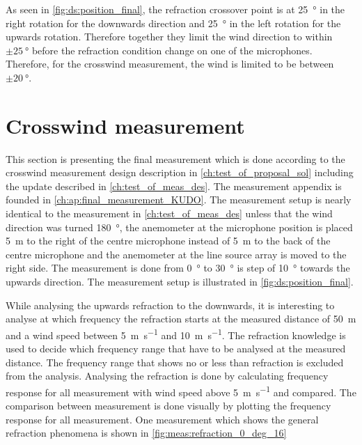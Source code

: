 As seen in \autoref{fig:ds:position_final}, the refraction crossover point is at \SI{25}{\degree} in the right rotation for the downwards direction and \SI{25}{\degree} in the left rotation for the upwards rotation. Therefore together they limit the wind direction to within $\pm\SI{25}{\degree}$ before the refraction condition change on one of the microphones. Therefore, for the crosswind measurement, the wind is limited to be between $\pm\SI{20}{\degree}$. 


\section{Crosswind measurement}\label{mes:kudo:cross_mes}
This section is presenting the final measurement which is done according to the crosswind measurement design description in \autoref{ch:test_of_proposal_sol} including the update described in \autoref{ch:test_of_meas_des}. The measurement appendix is founded in \autoref{ch:ap:final_measurement_KUDO}. The measurement setup is nearly identical to the measurement in \autoref{ch:test_of_meas_des} unless that the wind direction was turned \SI{180}{\degree}, the anemometer at the microphone position is placed \SI{5}{\meter} to the right of the centre microphone instead of \SI{5}{\meter} to the back of the centre microphone and the anemometer at the line source array is moved to the right side. The measurement is done from  \SI{0}{\degree} to  \SI{30}{\degree} is step of  \SI{10}{\degree} towards the upwards direction. The measurement setup is illustrated in \autoref{fig:ds:position_final}.





While analysing the upwards refraction to the downwards, it is interesting to analyse at which frequency the refraction starts at the measured distance of \SI{50}{\meter} and a wind speed between \SI{5}{\meter\per\second} and \SI{10}{\meter\per\second}. The refraction knowledge is used to decide which frequency range that have to be analysed at the measured distance. The frequency range that shows no or less than  refraction is excluded from the analysis. Analysing the refraction is done by calculating frequency response for all measurement with wind speed above \SI{5}{\meter\per\second} and compared. The comparison between measurement is done visually by plotting the frequency response for all measurement. One measurement which shows the general refraction phenomena is shown in \autoref{fig:meas:refraction_0_deg_16}



